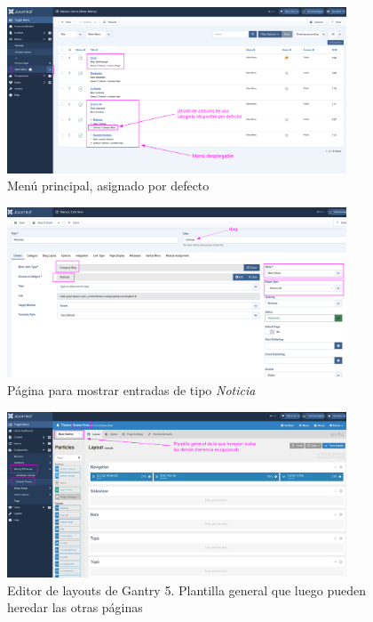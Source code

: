 \documentclass[a4paper]{article}
\begin{document}
\begin{figure}[H]
    \centering
    \includegraphics[width=0.9\textwidth]{images/backend-menu-main.png}
    \captionsetup{width=0.85\textwidth}
    \caption{Menú principal, asignado por defecto}
\end{figure}

\begin{figure}[H]
    \centering
    \includegraphics[width=0.9\textwidth]{images/backend-menu-news.png}
    \captionsetup{width=0.85\textwidth}
    \caption{Página para mostrar entradas de tipo \textit{Noticia}}
\end{figure}

\begin{figure}[H]
    \centering
    \includegraphics[width=0.9\textwidth]{images/backend-layout-base-outline.png}
    \captionsetup{width=0.85\textwidth}
    \caption{Editor de layouts de Gantry 5. Plantilla general que luego pueden heredar las otras páginas}
\end{figure}
\end{document}
